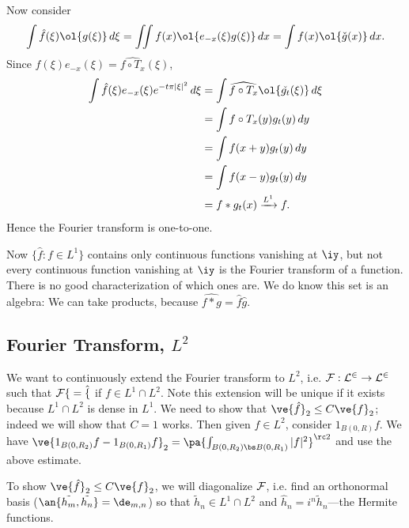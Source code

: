 Now consider %
\[
\int \hat{f}(\xi)\ol{g(\xi)}\,d\xi=\iint f(x)\ol{e_{-x}(\xi)g(\xi)}\,dx=\int f(x)\ol{\check{g}(x)}\,dx.
\]
Since $\hat{f}(\xi)e_{-x}(\xi)=\widehat{f\circ T_x}(\xi)$,
\begin{align*}
\int\hat{f}(\xi) e_{-x}(\xi) e^{-t\pi|\xi|^2}\,d\xi&=\int \widehat{f\circ T_x}\ol{\check{g_t}(\xi)}\,d\xi\\
&=\int f\circ T_x(y)g_t(y)\,dy\\
&=\int f(x+y)g_t(y)\,dy\\
&=\int f(x-y)g_t(y)\,dy\\
&=f*g_t(x)\xrightarrow{L^1} f.
\end{align*}
Hence the Fourier transform is one-to-one. 

Now $\{\hat{f}:f\in L^1\}$ contains only continuous functions vanishing at $\iy$, but not every continuous function vanishing at $\iy$ is the Fourier transform of a function. There is no good characterization of which ones are. 
We do know this set is an algebra: We can take products, because $\widehat{f*g}=\hat{f}\hat{g}$.

\subsection{Fourier Transform, $L^2$}
We want to continuously extend the Fourier transform to $L^2$, i.e. $\cal F:L^2\to L^2$ such that $\cal F f=\hat{f}$ if $f\in L^1\cap L^2$. Note this extension will be unique if it exists because $L^1\cap L^2$ is dense in $L^1$.
We need to show that $\ve{\hat{f}}_2\le C\ve{f}_2$; indeed we will show that $C=1$ works. Then given $f\in L^2$, consider $1_{B(0,R)}f$. We have $\ve{1_{B(0,R_2)}f-1_{B(0,R_1)}f}_2=\pa{\int_{B(0,R_2)\bs B(0,R_1)} |f|^2}^{\rc 2}$ and use the above estimate.

To show $\ve{\hat{f}}_2\le C\ve{f}_2$, we will diagonalize $\cal F$, i.e. find an orthonormal basis ($\an{\tilde{h_m},\tilde{h_n}}=\de_{m,n}$) so that $\tilde{h}_n\in L^1\cap L^2$ and $\hat{h}_n=i^n\tilde{h}_n$---the Hermite functions.